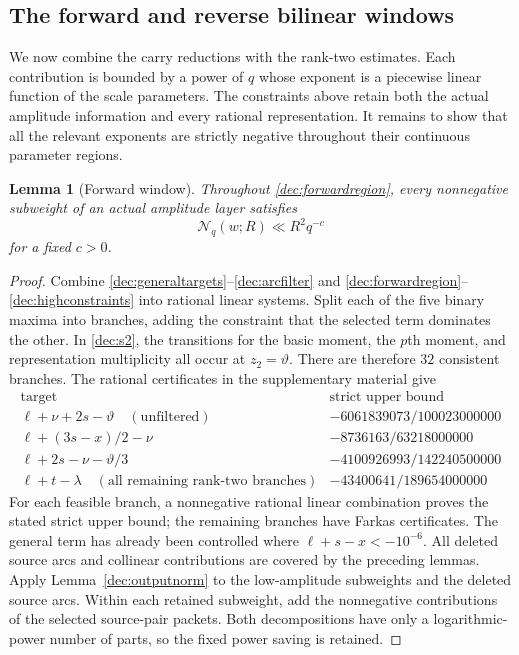 \documentclass[11pt,a4paper]{article}
\theoremstyle{paperplain}
\newtheorem{lemma}[theorem]{Lemma}
\numberwithin{equation}{section}
\begin{document}
\subsection{The forward and reverse bilinear windows}

We now combine the carry reductions with the rank-two estimates.
Each contribution is bounded by a power of $q$ whose exponent is a
piecewise linear function of the scale parameters. The constraints above
retain both the actual amplitude information and every rational
representation. It remains to show that all the relevant exponents are
strictly negative throughout their continuous parameter regions.

\begin{lemma}[Forward window]\label{dec:forwardlemma}
Throughout \eqref{dec:forwardregion}, every nonnegative subweight
of an actual amplitude layer satisfies
\[
 \mathcal N_q(w;R)\ll R^2q^{-c}
\]
for a fixed $c>0$.
\end{lemma}
\begin{proof}
Combine \eqref{dec:generaltargets}--\eqref{dec:arcfilter} and
\eqref{dec:forwardregion}--\eqref{dec:highconstraints} into rational
linear systems. Split each of the five binary maxima into branches,
adding the constraint that the selected term dominates the other.
In \eqref{dec:s2}, the transitions for the basic moment, the $p$th
moment, and representation multiplicity all occur at $z_2=\vartheta$.
There are therefore $32$ consistent branches.
The rational certificates in the supplementary material give
\[
\begin{array}{c|c}
 \text{target}&\text{strict upper bound}\\ \hline
 \ell+\nu+2s-\vartheta\quad(\text{unfiltered})&-6061839073/100023000000\\
 \ell+(3s-x)/2-\nu&-8736163/63218000000\\
 \ell+2s-\nu-\vartheta/3&-4100926993/142240500000\\
 \ell+t-\lambda\quad(\text{all remaining rank-two branches})&-43400641/189654000000
\end{array}
\]
For each feasible branch, a nonnegative rational linear combination
proves the stated strict upper bound; the remaining branches have
Farkas certificates. The general term has already been controlled
where $\ell+s-x<-10^{-6}$. All deleted source arcs and collinear
contributions are covered by the preceding lemmas.
Apply Lemma~\ref{dec:outputnorm} to the low-amplitude subweights and
the deleted source arcs. Within each retained subweight, add the
nonnegative contributions of the selected source-pair packets.
Both decompositions have only a logarithmic-power number of parts,
so the fixed power saving is retained.
\end{proof}
\end{document}
